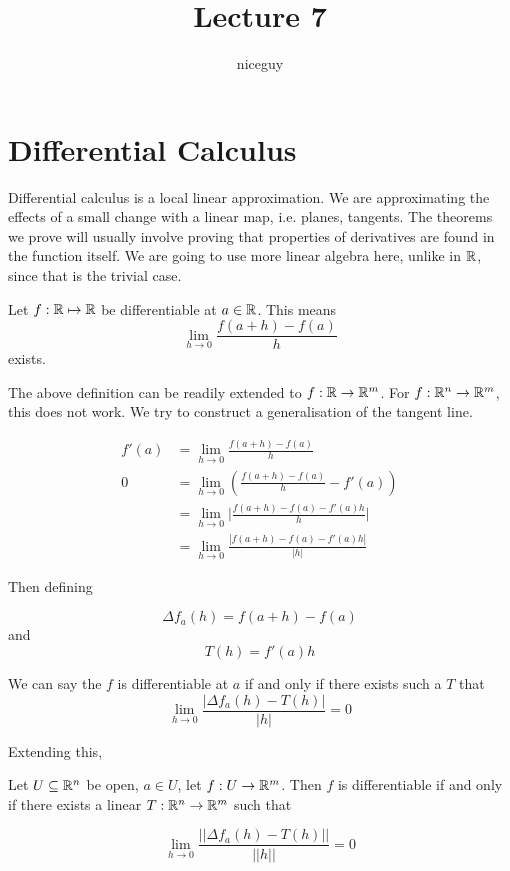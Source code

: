 \documentclass[12pt]{article}
\title{Lecture 7}
\author{niceguy}
\begin{document}
\maketitle

\section{Differential Calculus}

Differential calculus is a local linear approximation. We are approximating the effects of a small change with a linear map, i.e. planes, tangents. The theorems we prove will usually involve proving that properties of derivatives are found in the function itself. We are going to use more linear algebra here, unlike in $\mathbb{R}$, since that is the trivial case.

\begin{defn}
    Let $f:\mathbb{R}\mapsto\mathbb{R}$ be differentiable at $a \in \mathbb{R}$. This means
    $$\lim_{h\rightarrow0} \frac{f(a+h)-f(a)}{h}$$
    exists.
\end{defn}

The above definition can be readily extended to $f:\mathbb{R}\rightarrow\mathbb{R}^m$. For $f:\mathbb{R}^n\rightarrow\mathbb{R}^m$, this does not work. We try to construct a generalisation of the tangent line.

\begin{align*}
    f'(a) &= \lim_{h\rightarrow0} \frac{f(a+h)-f(a)}{h} \\
    0 &= \lim_{h\rightarrow0} \left(\frac{f(a+h)-f(a)}{h} - f'(a)\right) \\
      &= \lim_{h\rightarrow0} \Big |\frac{f(a+h)-f(a)-f'(a)h}{h}\Big | \\
      &= \lim_{h\rightarrow0} \frac{|f(a+h)-f(a)-f'(a)h|}{|h|}
\end{align*}

Then defining

$$\Delta f_a(h) = f(a+h) - f(a)$$
and
$$T(h) = f'(a)h$$

We can say the $f$ is differentiable at $a$ if and only if there exists such a $T$ that
$$\lim_{h\rightarrow0} \frac{|\Delta f_a(h) - T(h)|}{|h|} = 0$$

Extending this,

\begin{defn}
    Let $U \subseteq \mathbb{R}^n$ be open, $a \in U$, let $f:U \rightarrow \mathbb{R}^m$. Then $f$ is differentiable if and only if there exists a linear $T:\mathbb{R}^n\rightarrow\mathbb{R}^m$ such that

    $$\lim_{h\rightarrow0} \frac{||\Delta f_a(h) - T(h)||}{||h||} = 0$$
\end{defn}
\end{document}
